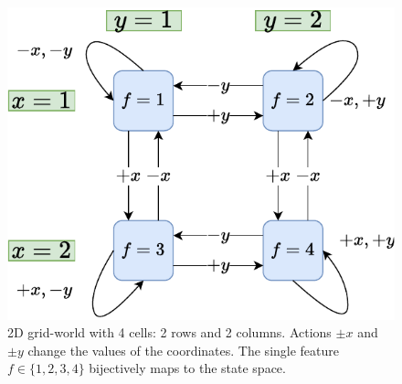 \documentclass[a4paper,11pt,oneside]{report}
\begin{document}
\begin{figure}[t]
    \centering
    \includegraphics[width=0.7\linewidth]{diagrams/env_2d_2x2.pdf}
    \caption{2D grid-world with 4 cells: 2 rows and 2 columns. Actions $\pm x$ and $\pm y$ change the values of the coordinates. The single feature $f\in\{1,2,3,4\}$ bijectively maps to the state space.}
    \label{fig:env2d2x2}
\end{figure}
\end{document}
